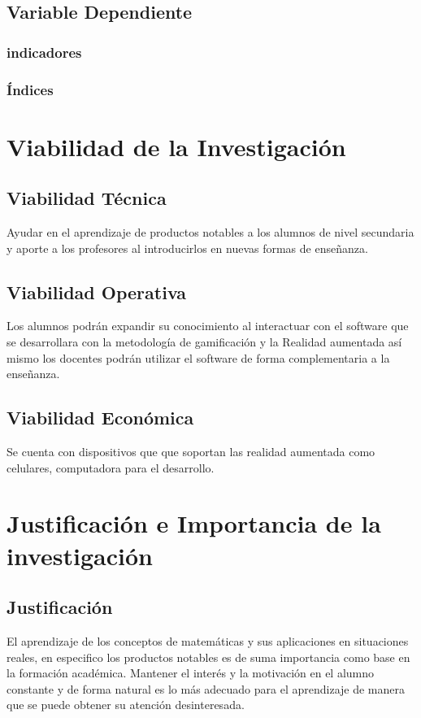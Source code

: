 \subsection{Variable Dependiente}
\subsubsection{indicadores}
\subsubsection{Índices}

\section{Viabilidad de la Investigación}
\subsection{Viabilidad Técnica}
Ayudar en el aprendizaje de productos notables a los alumnos de nivel secundaria y aporte a los profesores al introducirlos en nuevas formas de enseñanza.

\subsection{Viabilidad Operativa}
Los alumnos podrán expandir su conocimiento al interactuar con el software que se desarrollara con la metodología de gamificación y la Realidad aumentada así mismo los docentes podrán utilizar el software de forma complementaria a la enseñanza.

\subsection{Viabilidad Económica}

Se cuenta con dispositivos que que soportan las realidad aumentada como celulares, computadora para el desarrollo.

\section{Justificación e Importancia de la investigación}
    \subsection{Justificación}
    El aprendizaje de los conceptos de matemáticas y sus aplicaciones en situaciones reales, en especifico los productos notables es de suma importancia como base en la formación académica. Mantener el interés y la motivación en el alumno constante y de forma natural es lo más adecuado para el aprendizaje\cite{Zarra2001} de manera que se puede obtener su atención desinteresada.
    
